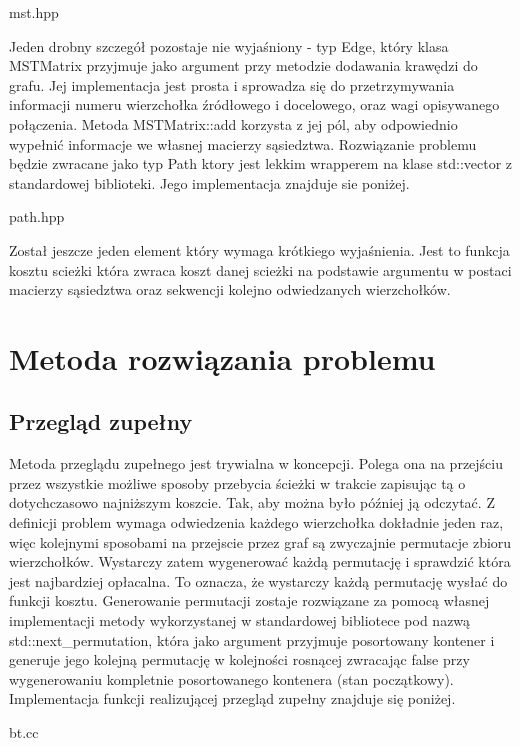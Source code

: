 \documentclass[polish,polish,a4paper]{article}
\begin{document}

{mst.hpp}

Jeden drobny szczegół pozostaje nie wyjaśniony - typ Edge, który klasa MSTMatrix przyjmuje jako argument przy metodzie dodawania krawędzi do grafu.
Jej implementacja jest prosta i sprowadza się do przetrzymywania informacji numeru wierzchołka źródłowego i docelowego, oraz wagi opisywanego połączenia.
Metoda MSTMatrix::add korzysta z jej pól, aby odpowiednio wypełnić informacje we własnej macierzy sąsiedztwa.
Rozwiązanie problemu będzie zwracane jako typ Path ktory jest lekkim wrapperem na klase std::vector z standardowej biblioteki.
Jego implementacja znajduje sie poniżej.


{path.hpp}

Został jeszcze jeden element który wymaga krótkiego wyjaśnienia. Jest to funkcja kosztu scieżki która zwraca koszt danej scieżki na podstawie argumentu w postaci macierzy sąsiedztwa
oraz sekwencji kolejno odwiedzanych wierzchołków.

\section{Metoda rozwiązania problemu}

\subsection{Przegląd zupełny}
Metoda przeglądu zupełnego jest trywialna w koncepcji. Polega ona na przejściu przez wszystkie możliwe sposoby przebycia ścieżki w trakcie zapisując tą o dotychczasowo najniższym koszcie.
Tak, aby można było później ją odczytać. Z definicji problem wymaga odwiedzenia każdego wierzchołka dokładnie jeden raz, więc kolejnymi sposobami na przejscie przez graf są zwyczajnie
permutacje zbioru wierzchołków. Wystarczy zatem wygenerować każdą permutację i sprawdzić która jest najbardziej opłacalna. To oznacza, że wystarczy każdą permutację wysłać do funkcji
kosztu. Generowanie permutacji zostaje rozwiązane za pomocą własnej implementacji metody wykorzystanej w standardowej bibliotece pod nazwą std::next\_permutation, która jako argument 
przyjmuje posortowany kontener i generuje jego kolejną permutację w kolejności rosnącej zwracając false przy wygenerowaniu kompletnie posortowanego kontenera (stan początkowy).
Implementacja funkcji realizującej przegląd zupełny znajduje się poniżej.

{bt.cc}
\end{document}
